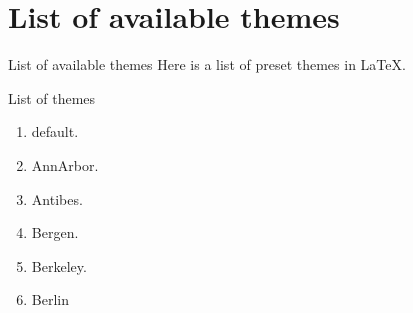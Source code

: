 \documentclass{beamer}
\begin{document}
	\section{List of available themes}
		\begin{frame}{List of available themes}
		Here is a list of preset themes in \LaTeX{}.
			\begin{block}{List of themes}
				\begin{enumerate}
					\item default.
					\item AnnArbor.
					\item Antibes.
					\item Bergen.
					\item Berkeley.
					\item Berlin
				\end{enumerate}							
			\end{block}
		\end{frame}
		
\end{document}
